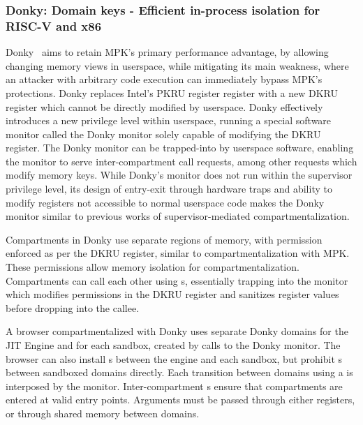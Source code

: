 \subsubsection{Donky: Domain keys - Efficient in-process isolation for RISC-V and x86}
Donky~\cite{SchrammelWSS0MG20Donky} aims to retain MPK's primary 
performance advantage, by allowing changing memory views in userspace, 
while mitigating its main weakness, 
where an attacker with arbitrary code execution can immediately bypass
MPK's protections.
Donky replaces Intel's PKRU register register with a new DKRU register
which cannot be directly modified by userspace.
Donky effectively introduces a new privilege level within userspace, 
running a special software monitor called the Donky monitor solely 
capable of modifying the DKRU register.
The Donky monitor can be trapped-into by userspace software, enabling the
monitor to serve inter-compartment call requests, among other requests
which modify memory keys.
While Donky's monitor does not run within the supervisor privilege level,
its design of entry-exit through hardware traps and ability to modify
registers not accessible to normal userspace code makes the Donky monitor
similar to previous works of supervisor-mediated compartmentalization.

Compartments in Donky use separate regions of memory, with permission
enforced as per the DKRU register, similar to compartmentalization with
MPK.
These permissions allow memory isolation for compartmentalization.
Compartments can call each other using s, essentially trapping
into the monitor which modifies permissions in the DKRU register and
sanitizes register values before dropping into the callee.

A browser compartmentalized with Donky uses separate Donky domains for the 
JIT Engine and for each sandbox, created by calls to the Donky monitor.
The browser can also install s between the engine and each
sandbox, but prohibit s between sandboxed domains directly.
Each transition between domains using a  is interposed by the
monitor.
Inter-compartment s ensure that compartments are entered at
valid entry points.
Arguments must be passed through either registers, or through shared memory
between domains.

